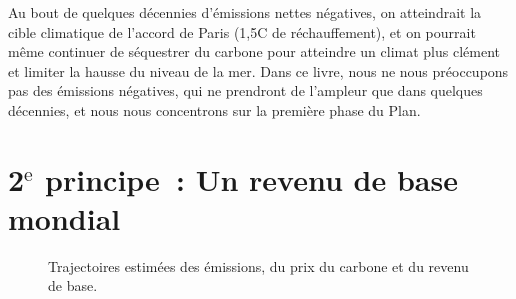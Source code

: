 \documentclass[a5paper,french,openany]{memoir}
\begin{document}
Au bout de quelques décennies d'émissions nettes négatives, on atteindrait la cible climatique de l'accord de Paris (1,5\textdegree{}C de réchauffement), et on pourrait même continuer de séquestrer du carbone pour atteindre un climat plus clément et limiter la hausse du niveau de la mer. Dans ce livre, nous ne nous préoccupons pas des émissions négatives, qui ne prendront de l'ampleur que dans quelques décennies, et nous nous concentrons sur la première phase du Plan. 

\section{2$^\text{e}$ principe~: Un revenu de base mondial}\label{pcp:rdb}

\begin{figure}[bh!]
  \caption[Trajectoires (émissions, prix, revenu de base)]{Trajectoires estimées des émissions, du prix du carbone et du revenu de base.}\label{fig:trajectory}
\end{figure} 
\end{document}

